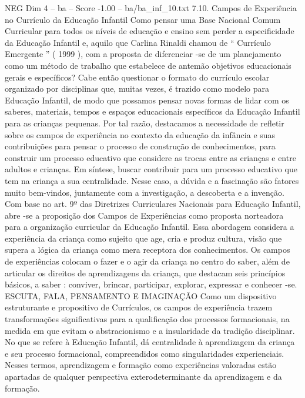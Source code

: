 \begin{textsample}{NEG Dim 4 – ba – Score -1.00 – ba/ba\_inf\_10.txt}  \label{ex:f4_neg_266}
7.10.
Campos de Experiência no Currículo da Educação Infantil Como pensar uma Base Nacional Comum Curricular para todos os níveis de educação e ensino sem perder a especificidade da Educação Infantil e, aquilo que Carlina Rinaldi chamou de “ Currículo Emergente ” ( 1999 ), com a proposta de diferenciar -se de um planejamento como um método de trabalho que estabelece de antemão objetivos educacionais gerais e específicos?
Cabe então questionar o formato do currículo escolar organizado por disciplinas que, muitas vezes, é trazido como modelo para Educação Infantil, de modo que possamos pensar novas formas de lidar com os saberes, materiais, tempos e espaços educacionais específicos da Educação Infantil para as crianças pequenas.
Por tal razão, destacamos a necessidade de refletir sobre os campos de experiência no contexto da educação da infância e suas contribuições para pensar o processo de construção de conhecimentos, para construir um processo educativo que considere as trocas entre as crianças e entre adultos e crianças.
Em síntese, buscar contribuir para um processo educativo que tem na criança a sua centralidade.
Nesse caso, a dúvida e a fascinação são fatores muito bem-vindos, juntamente com a investigação, a descoberta e a invenção.
Com base no art. 9º das Diretrizes Curriculares Nacionais para Educação Infantil, abre -se a proposição dos Campos de Experiências como proposta norteadora para a organização curricular da Educação Infantil.
Essa abordagem considera a experiência da criança como sujeito que age, cria e produz cultura, visão que supera a lógica da criança como mera receptora dos conhecimentos.
Os campos de experiências colocam o fazer e o agir da criança no centro do saber, além de articular os direitos de aprendizagens da criança, que destacam seis princípios básicos, a saber : conviver, brincar, participar, explorar, expressar e conhecer -se.
ESCUTA, FALA, PENSAMENTO E IMAGINAÇÃO Como um dispositivo estruturante e propositivo de Currículos, os campos de experiência trazem transformações significativas para a qualificação dos processos formacionais, na medida em que evitam o abstracionismo e a insularidade da tradição disciplinar.
No que se refere à Educação Infantil, dá centralidade à aprendizagem da criança e seu processo formacional, compreendidos como singularidades experienciais.
Nesses termos, aprendizagem e formação como experiências valoradas estão apartadas de qualquer perspectiva exterodeterminante da aprendizagem e da formação.

\end{textsample}
